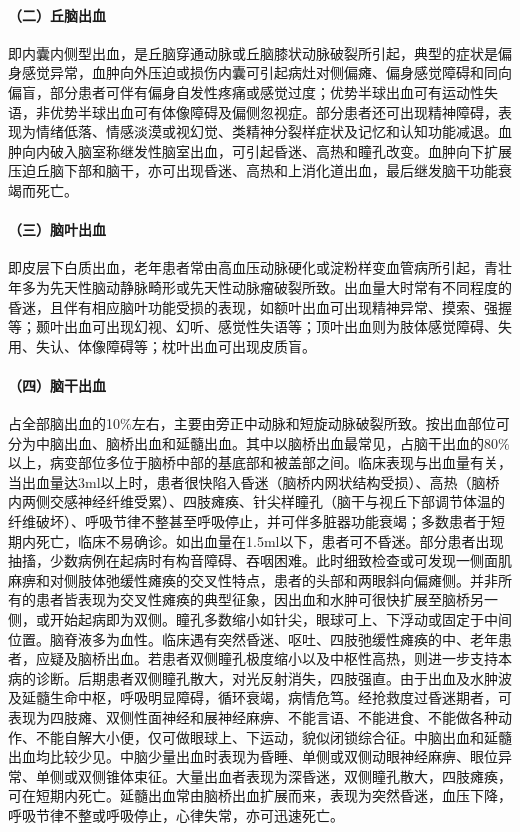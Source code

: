 \paragraph{（二）丘脑出血}

即内囊内侧型出血，是丘脑穿通动脉或丘脑膝状动脉破裂所引起，典型的症状是偏身感觉异常，血肿向外压迫或损伤内囊可引起病灶对侧偏瘫、偏身感觉障碍和同向偏盲，部分患者可伴有偏身自发性疼痛或感觉过度；优势半球出血可有运动性失语，非优势半球出血可有体像障碍及偏侧忽视症。部分患者还可出现精神障碍，表现为情绪低落、情感淡漠或视幻觉、类精神分裂样症状及记忆和认知功能减退。血肿向内破入脑室称继发性脑室出血，可引起昏迷、高热和瞳孔改变。血肿向下扩展压迫丘脑下部和脑干，亦可出现昏迷、高热和上消化道出血，最后继发脑干功能衰竭而死亡。

\paragraph{（三）脑叶出血}

即皮层下白质出血，老年患者常由高血压动脉硬化或淀粉样变血管病所引起，青壮年多为先天性脑动静脉畸形或先天性动脉瘤破裂所致。出血量大时常有不同程度的昏迷，且伴有相应脑叶功能受损的表现，如额叶出血可出现精神异常、摸索、强握等；颞叶出血可出现幻视、幻听、感觉性失语等；顶叶出血则为肢体感觉障碍、失用、失认、体像障碍等；枕叶出血可出现皮质盲。

\paragraph{（四）脑干出血}

占全部脑出血的10\%左右，主要由旁正中动脉和短旋动脉破裂所致。按出血部位可分为中脑出血、脑桥出血和延髓出血。其中以脑桥出血最常见，占脑干出血的80\%以上，病变部位多位于脑桥中部的基底部和被盖部之间。临床表现与出血量有关，当出血量达3ml以上时，患者很快陷入昏迷（脑桥内网状结构受损）、高热（脑桥内两侧交感神经纤维受累）、四肢瘫痪、针尖样瞳孔（脑干与视丘下部调节体温的纤维破坏）、呼吸节律不整甚至呼吸停止，并可伴多脏器功能衰竭；多数患者于短期内死亡，临床不易确诊。如出血量在1.5ml以下，患者可不昏迷。部分患者出现抽搐，少数病例在起病时有构音障碍、吞咽困难。此时细致检查或可发现一侧面肌麻痹和对侧肢体弛缓性瘫痪的交叉性特点，患者的头部和两眼斜向偏瘫侧。并非所有的患者皆表现为交叉性瘫痪的典型征象，因出血和水肿可很快扩展至脑桥另一侧，或开始起病即为双侧。瞳孔多数缩小如针尖，眼球可上、下浮动或固定于中间位置。脑脊液多为血性。临床遇有突然昏迷、呕吐、四肢弛缓性瘫痪的中、老年患者，应疑及脑桥出血。若患者双侧瞳孔极度缩小以及中枢性高热，则进一步支持本病的诊断。后期患者双侧瞳孔散大，对光反射消失，四肢强直。由于出血及水肿波及延髓生命中枢，呼吸明显障碍，循环衰竭，病情危笃。经抢救度过昏迷期者，可表现为四肢瘫、双侧性面神经和展神经麻痹、不能言语、不能进食、不能做各种动作、不能自解大小便，仅可做眼球上、下运动，貌似闭锁综合征。中脑出血和延髓出血均比较少见。中脑少量出血时表现为昏睡、单侧或双侧动眼神经麻痹、眼位异常、单侧或双侧锥体束征。大量出血者表现为深昏迷，双侧瞳孔散大，四肢瘫痪，可在短期内死亡。延髓出血常由脑桥出血扩展而来，表现为突然昏迷，血压下降，呼吸节律不整或呼吸停止，心律失常，亦可迅速死亡。


